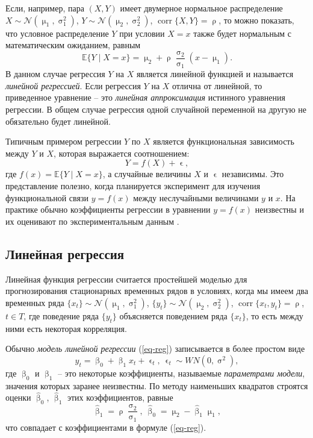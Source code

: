 \documentclass[a4paper, 14pt]{extreport}
\numberwithin{equation}{section}
\renewcommand{\beta}{\upbeta}
\renewcommand{\epsilon}{\upvarepsilon}
\renewcommand{\mu}{\upmu}
\renewcommand{\rho}{\uprho}
\renewcommand{\sigma}{\upsigma}
\newcommand{\E}{\mathbb E}
\newcommand{\corr}{\operatorname{corr}}
\numberwithin{equation}{section}
\begin{document}
	Если, например, пара $(X, Y)$ имеет двумерное нормальное распределение $X \sim \mathcal N(\mu_1, \sigma_1^2)$, $Y\sim \mathcal N(\mu_2,\sigma_2^2)$, $\corr\{X, Y\}=\rho$, то можно показать, что условное распределение $Y$ при условии $X=x$ также будет нормальным с математическим ожиданием, равным
	\begin{equation}\label{eq-reg}
		\E\{Y\mid X=x\}=\mu _{2}+\rho {\frac {\sigma _{2}}{\sigma _{1}}}(x-\mu _{1}).
	\end{equation}
	В данном случае регрессия $Y$ на $X$ является линейной функцией и называется \textit{линейной регрессией}. Если регрессия $Y$ на $X$ отлична от линейной, то приведенное уравнение -- это \textit{линейная аппроксимация} истинного уравнения регрессии.
	В общем случае регрессия одной случайной переменной на другую не обязательно будет линейной.
	
	Типичным примером регрессии $Y$ по $X$ является функциональная зависимость между $Y$ и $X$, которая выражается соотношением: 
	\begin{equation}
		Y=f(X)+\epsilon,
	\end{equation}
	где $f(x)=\mathbb E\{Y \mid X=x\}$, а случайные величины $X$ и $\epsilon$ независимы. Это представление полезно, когда планируется эксперимент для изучения функциональной связи $y=f(x)$ между неслучайными величинами $y$ и $x$. На практике обычно коэффициенты регрессии в уравнении $y=f(x)$ неизвестны и их оценивают по экспериментальным данным \cite{3}.
	
	\subsection{Линейная регрессия}
	
	Линейная функция регрессии считается простейшей моделью для прогнозирования стационарных временных рядов в условиях, когда мы имеем два временных ряда  $\{x_t\} \sim \mathcal N(\mu_1, \sigma_1^2)$, $\{y_t\}\sim \mathcal N (\mu_2,\sigma_2^2)$, $\corr\{x_t, y_t\}=\rho$, $t\in T$, где поведение ряда $\{y_t\}$ объясняется поведением ряда $\{x_t\}$, то есть между ними есть некоторая корреляция.
	
	Обычно \textit{модель линейной регрессии} (\ref{eq-reg}) записывается в более простом виде
	\begin{equation}\label{eq-lin-reg}
		y_t = \beta_0 + \beta_1 x_t + \epsilon_t,\ \epsilon_t \sim WN(0,\sigma^2),
	\end{equation}
	где $\beta_0$ и $\beta_1$ -- это некоторые коэффициенты, называемые \textit{параметрами модели}, значения которых заранее неизвестны. По методу наименьших квадратов строятся оценки $\hat \beta_0$, $\hat \beta_1$ этих коэффициентов, равные
	\begin{equation}
		\hat \beta _1 = \rho {\frac {\sigma _{2}}{\sigma _{1}}},\ \hat \beta_0 = \mu_2 - \hat\beta_1 \mu_1,
	\end{equation}
	что совпадает с коэффициентами в формуле (\ref{eq-reg}).
	
\end{document}
